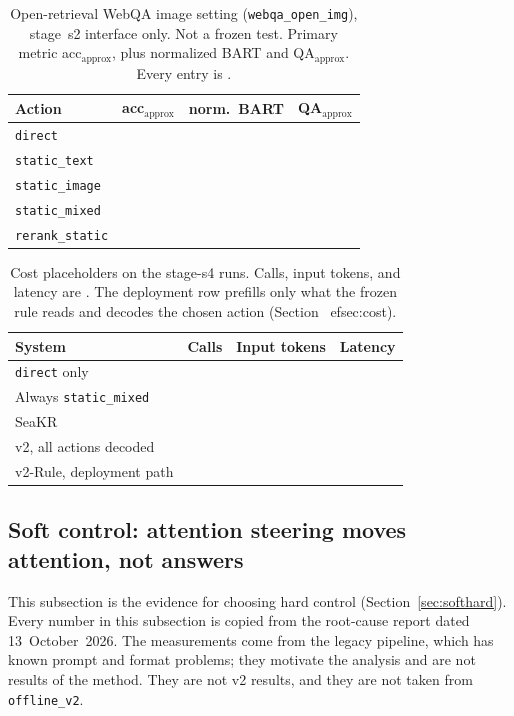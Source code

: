 \begin{table}[t]
\caption{Open-retrieval WebQA image setting (\texttt{webqa\_open\_img}), stage~s2 interface only.
Not a frozen test.
Primary metric acc$_{\mathrm{approx}}$, plus normalized BART and QA$_{\mathrm{approx}}$.
Every entry is \ph{}.}
\label{tab:open}
\small
\begin{tabular}{@{}lccc@{}}
\toprule
Action & acc$_{\mathrm{approx}}$ & norm.\ BART & QA$_{\mathrm{approx}}$ \\
\midrule
\texttt{direct} & \ph{} & \ph{} & \ph{} \\
\texttt{static\_text} & \ph{} & \ph{} & \ph{} \\
\texttt{static\_image} & \ph{} & \ph{} & \ph{} \\
\texttt{static\_mixed} & \ph{} & \ph{} & \ph{} \\
\texttt{rerank\_static} & \ph{} & \ph{} & \ph{} \\
\bottomrule
\end{tabular}
\end{table}

\begin{table}[t]
\caption{Cost placeholders on the stage-s4 runs.
Calls, input tokens, and latency are \ph{}. The deployment row prefills only what the frozen rule reads and decodes the chosen action (Section~
ef{sec:cost}).}
\label{tab:cost}
\small
\begin{tabular}{@{}lccc@{}}
\toprule
System & Calls & Input tokens & Latency \\
\midrule
\texttt{direct} only & \ph{} & \ph{} & \ph{} \\
Always \texttt{static\_mixed} & \ph{} & \ph{} & \ph{} \\
SeaKR & \ph{} & \ph{} & \ph{} \\
v2, all actions decoded & \ph{} & \ph{} & \ph{} \\
v2-Rule, deployment path & \ph{} & \ph{} & \ph{} \\
\bottomrule
\end{tabular}
\end{table}

\subsection{Soft control: attention steering moves attention, not answers}
\label{sec:steer}
This subsection is the evidence for choosing hard control (Section~\ref{sec:softhard}).
Every number in this subsection is copied from the root-cause report dated 13~October~2026.
The measurements come from the legacy pipeline, which has known prompt and format problems; they motivate the analysis and are not results of the method.
They are not v2 results, and they are not taken from \texttt{offline\_v2}.

